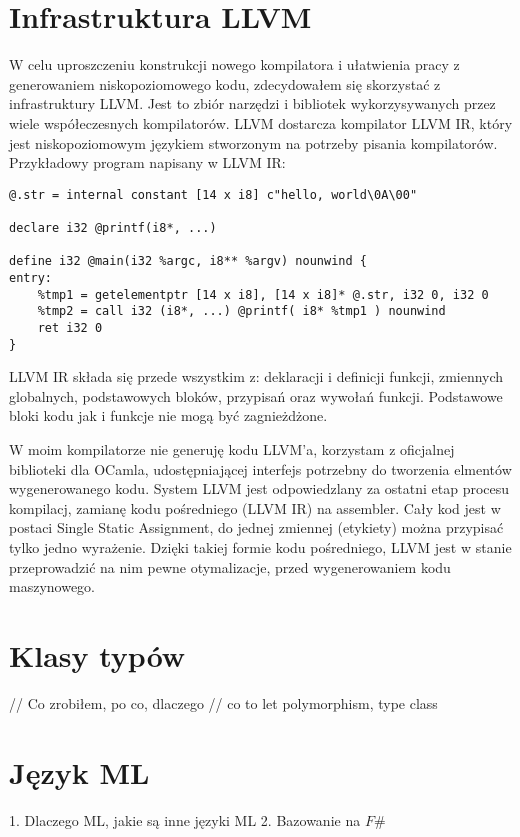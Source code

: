 \documentclass[declaration,shortabstract]{iithesis}
\begin{document}
\section{Infrastruktura LLVM}
W celu uproszczeniu konstrukcji nowego kompilatora i ułatwienia pracy z generowaniem 
niskopoziomowego kodu, zdecydowałem się skorzystać z infrastruktury LLVM. Jest to zbiór 
narzędzi i bibliotek wykorzysywanych przez wiele współeczesnych kompilatorów. LLVM dostarcza 
kompilator LLVM IR, który jest niskopoziomowym językiem stworzonym na potrzeby pisania 
kompilatorów. Przykładowy program napisany w LLVM IR:

\lstset{language=llvm}
\begin{lstlisting}
@.str = internal constant [14 x i8] c"hello, world\0A\00"

declare i32 @printf(i8*, ...)

define i32 @main(i32 %argc, i8** %argv) nounwind {
entry:
    %tmp1 = getelementptr [14 x i8], [14 x i8]* @.str, i32 0, i32 0
    %tmp2 = call i32 (i8*, ...) @printf( i8* %tmp1 ) nounwind
    ret i32 0
}
\end{lstlisting}

LLVM IR składa się przede wszystkim z: deklaracji i definicji funkcji, zmiennych globalnych, 
podstawowych bloków, przypisań oraz wywołań funkcji. Podstawowe bloki kodu jak i funkcje nie 
mogą być zagnieżdżone. 

W moim kompilatorze nie generuję kodu LLVM'a, korzystam z oficjalnej biblioteki dla OCamla, 
udostępniającej interfejs potrzebny do tworzenia elmentów wygenerowanego kodu. System LLVM 
jest odpowiedzlany za ostatni etap procesu kompilacj, zamianę kodu pośredniego (LLVM IR) na 
assembler. Cały kod jest w postaci Single Static Assignment, do jednej zmiennej (etykiety) 
można przypisać tylko jedno wyrażenie. Dzięki takiej formie kodu pośredniego, LLVM jest w 
stanie przeprowadzić na nim pewne otymalizacje, przed wygenerowaniem kodu maszynowego. 

\section{Klasy typów}


// Co zrobiłem, po co, dlaczego
// co to {let polymorphism, type class}
\section{Język ML}
1. Dlaczego ML, jakie są inne języki ML
2. Bazowanie na $ F\# $
\end{document}
